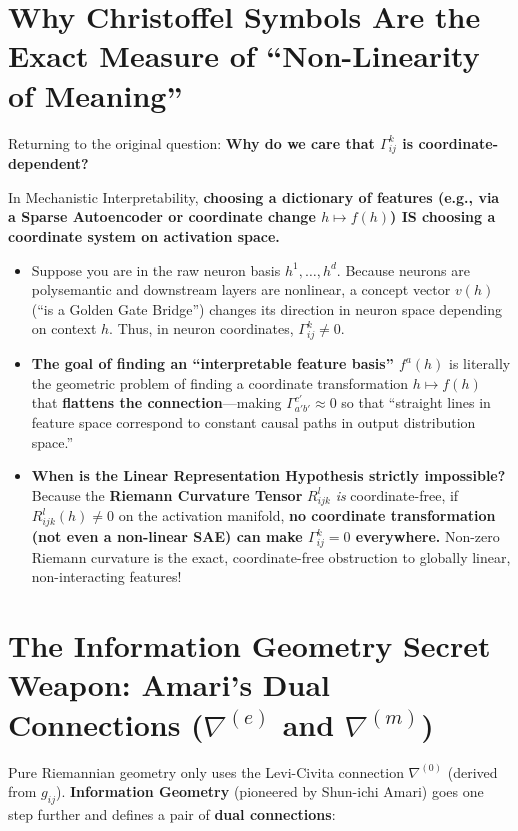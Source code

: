 \documentclass[11pt,a4paper]{article}
\begin{document}
\section{Why Christoffel Symbols Are the Exact Measure of ``Non-Linearity of Meaning''}

Returning to the original question: \textbf{Why do we care that $\Gamma^k_{ij}$ is coordinate-dependent?}

In Mechanistic Interpretability, \textbf{choosing a dictionary of features (e.g., via a Sparse Autoencoder or coordinate change $h \mapsto f(h)$) IS choosing a coordinate system on activation space.}

\begin{itemize}[leftmargin=*]
    \item Suppose you are in the raw neuron basis $h^1, \dots, h^d$. Because neurons are polysemantic and downstream layers are nonlinear, a concept vector $v(h)$ (``is a Golden Gate Bridge'') changes its direction in neuron space depending on context $h$. Thus, in neuron coordinates, $\Gamma^k_{ij} \neq 0$.
    \item \textbf{The goal of finding an ``interpretable feature basis'' $f^a(h)$} is literally the geometric problem of finding a coordinate transformation $h \mapsto f(h)$ that \textbf{flattens the connection}---making $\Gamma^{c'}_{a'b'} \approx 0$ so that ``straight lines in feature space correspond to constant causal paths in output distribution space.''
    \item \textbf{When is the Linear Representation Hypothesis strictly impossible?}
    Because the \textbf{Riemann Curvature Tensor} $R^l_{ijk}$ \emph{is} coordinate-free, if $R^l_{ijk}(h) \neq 0$ on the activation manifold, \textbf{no coordinate transformation (not even a non-linear SAE) can make $\Gamma^k_{ij} = 0$ everywhere.} Non-zero Riemann curvature is the exact, coordinate-free obstruction to globally linear, non-interacting features!
\end{itemize}

\section{The Information Geometry Secret Weapon: Amari's Dual Connections (\texorpdfstring{$\nabla^{(e)}$ and $\nabla^{(m)}$}{e- and m-connections})}

Pure Riemannian geometry only uses the Levi-Civita connection $\nabla^{(0)}$ (derived from $g_{ij}$). \textbf{Information Geometry} (pioneered by Shun-ichi Amari) goes one step further and defines a pair of \textbf{dual connections}:
\end{document}
